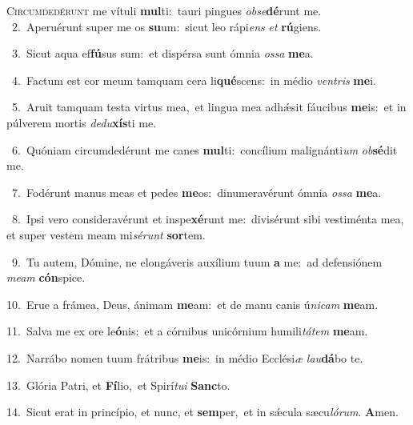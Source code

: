 \lettrine{\initial\textcolor{\initialcolor}{C}}{ircumdedérunt} me vítuli \textbf{mul}\-ti:~\star tauri pingues \textit{ob}\-\textit{se}\textbf{dé}runt me.\\
{\numbfont\textcolor{\numbcolor}{~2.}}~Aperuérunt super me os \textbf{su}\-um:~\star sicut leo rápi\textit{ens} \textit{et} \textbf{rú}\-giens.\par
{\numbfont\textcolor{\numbcolor}{~3.}}~Sicut aqua ef\-\textbf{fú}\-sus sum:~\star et dispérsa sunt ómnia \textit{os}\-\textit{sa} \textbf{me}\-a.\par
{\numbfont\textcolor{\numbcolor}{~4.}}~Factum est cor meum tamquam cera li\-\textbf{qué}\-scens:~\star in médio \textit{ven}\-\textit{tris} \textbf{me}\-i.\par
{\numbfont\textcolor{\numbcolor}{~5.}}~Aruit tamquam testa virtus mea,~\dagger et lingua mea adhǽsit fáucibus \textbf{me}\-is:~\star et in púlverem mortis \textit{de}\-\textit{du}\textbf{xís}ti me.\par
{\numbfont\textcolor{\numbcolor}{~6.}}~Quóniam circumdedérunt me canes \textbf{mul}\-ti:~\star concílium malignánti\textit{um} \textit{ob}\-\textbf{sé}dit me.\par
{\numbfont\textcolor{\numbcolor}{~7.}}~Fodérunt manus meas et pedes \textbf{me}\-os:~\star dinumeravérunt ómnia \textit{os}\-\textit{sa} \textbf{me}\-a.\par
{\numbfont\textcolor{\numbcolor}{~8.}}~Ipsi vero consideravérunt et inspe\-\textbf{xé}\-runt me:~\star divisérunt sibi vestiménta mea, et super vestem meam mi\-\textit{sé}\-\textit{runt} \textbf{sor}\-tem.\par
{\numbfont\textcolor{\numbcolor}{~9.}}~Tu autem, Dómine, ne elongáveris auxílium tuum \textbf{a} me:~\star ad defensiónem \textit{me}\-\textit{am} \textbf{cón}\-spice.\par
{\numbfont\textcolor{\numbcolor}{10.}}~Erue a frámea, Deus, ánimam \textbf{me}\-am:~\star et de manu canis ú\-\textit{ni}\-\textit{cam} \textbf{me}\-am.\par
{\numbfont\textcolor{\numbcolor}{11.}}~Salva me ex ore le\-\textbf{ó}\-nis:~\star et a córnibus unicórnium humili\-\textit{tá}\-\textit{tem} \textbf{me}\-am.\par
{\numbfont\textcolor{\numbcolor}{12.}}~Narrábo nomen tuum frátribus \textbf{me}\-is:~\star in médio Ecclési\textit{æ} \textit{lau}\-\textbf{dá}bo te.\par
{\numbfont\textcolor{\numbcolor}{13.}}~Glória Patri, et \textbf{Fí}\-lio,~\star et Spirí\-\textit{tu}\-\textit{i} \textbf{Sanc}\-to.\par
{\numbfont\textcolor{\numbcolor}{14.}}~Sicut erat in princípio, et nunc, et \textbf{sem}\-per,~\star et in sǽcula sæcu\-\textit{ló}\-\textit{rum}. \textbf{A}\-men.\par
